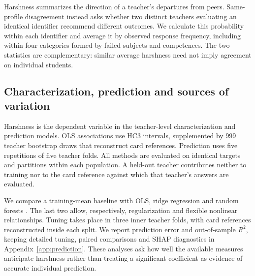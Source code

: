 Harshness summarizes the direction of a teacher's departures from peers. Same-profile disagreement instead asks whether two distinct teachers evaluating an identical identifier recommend different outcomes. We calculate this probability within each identifier and average it by observed response frequency, including within four categories formed by failed subjects and competences. The two statistics are complementary: similar average harshness need not imply agreement on individual students.

\subsection{Characterization, prediction and sources of variation}
Harshness is the dependent variable in the teacher-level characterization and prediction models. OLS associations use HC3 intervals, supplemented by 999 teacher bootstrap draws that reconstruct card references. Prediction uses five repetitions of five teacher folds. All methods are evaluated on identical targets and partitions within each population. A held-out teacher contributes neither to training nor to the card reference against which that teacher's answers are evaluated.

We compare a training-mean baseline with OLS, ridge regression and random forests \cite{rf}. The last two allow, respectively, regularization and flexible nonlinear relationships. Tuning takes place in three inner teacher folds, with card references reconstructed inside each split. We report prediction error and out-of-sample $R^2$, keeping detailed tuning, paired comparisons and SHAP diagnostics \cite{shap} in Appendix~\ref{app:prediction}. These analyses ask how well the available measures anticipate harshness rather than treating a significant coefficient as evidence of accurate individual prediction.

